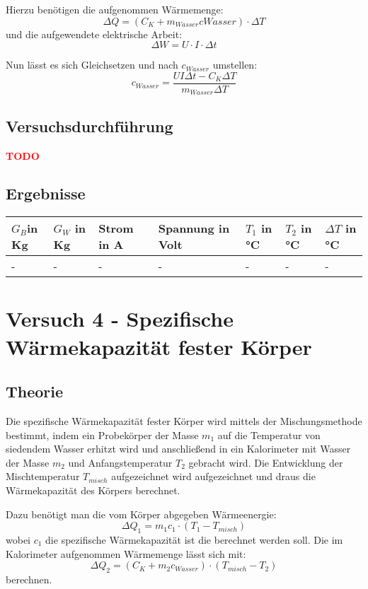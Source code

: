    \noindent Hierzu benötigen die aufgenommen Wärmemenge:
   $$\Delta Q = (C_{K} + m_{Wasser}c{Wasser} ) \cdot \Delta T$$
   und die aufgewendete elektrische Arbeit:
   $$\Delta W =  U \cdot I \cdot \Delta t$$
   
   Nun lässt es sich Gleichsetzen und nach $c_{Wasser}$ umstellen:
   $$c_{Wasser} = \frac{UI\Delta t - C_{K}\Delta T}{m_{Wasser} \Delta T}$$
    \subsection{Versuchsdurchführung}

        		\textbf{\textcolor{red}{TODO}}
    \subsection{Ergebnisse}



        \begin{table}[H]
            \centering
            \begin{tabular}{|l|l|l|l|l|l|l|}
                \hline
                $G_{B}$in Kg & $G_{W}$ in Kg & Strom in A & Spannung in Volt  & $T_{1}$ in °C & $T_{2}$ in °C & $\Delta T$ in °C \\
                \hline
                -& - & - & - & - & - & - \\
                \hline
    
            \end{tabular}
        \end{table}

\section{Versuch 4 - Spezifische Wärmekapazität fester Körper}
	    \subsection{Theorie}
	Die spezifische Wärmekapazität fester Körper wird mittels der Mischungsmethode bestimmt, indem ein Probekörper der Masse $m_{1}$ auf die Temperatur von siedendem Wasser erhitzt wird und anschließend in ein Kalorimeter mit Wasser der Masse $m_{2}$ und Anfangstemperatur $T_{2}$ gebracht wird. Die Entwicklung der Mischtemperatur $T_{misch}$ aufgezeichnet wird aufgezeichnet und draus die Wärmekapazität des Körpers berechnet.
	
	Dazu benötigt man die vom Körper abgegeben Wärmeenergie:
	$$\Delta Q_{1} = m_{1}c_{1} \cdot (T_{1} - T_{misch})$$
	wobei $c_{1}$ die spezifische Wärmekapazität ist die berechnet werden soll. Die im Kalorimeter aufgenommen Wärmemenge lässt sich mit:
	$$\Delta Q_{2} = (C_{K} + m_{2}c_{Wasser}) \cdot (T_{misch} - T_{2})$$
	berechnen.
	
